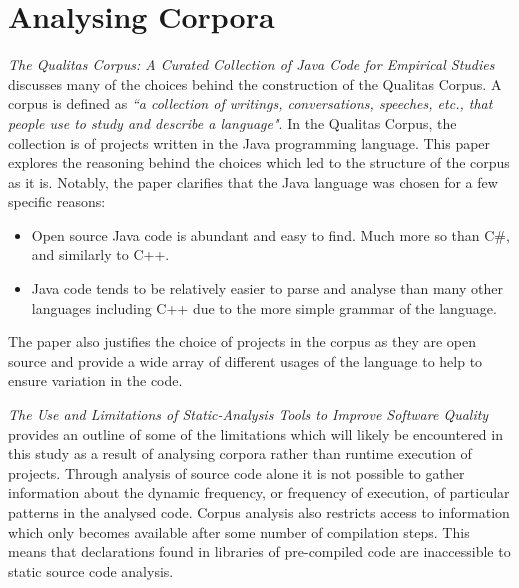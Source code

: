 \section{Analysing Corpora}
\textit{The Qualitas Corpus: A Curated Collection of Java Code for Empirical Studies}~\cite{QualitasCorpus} discusses many of the choices behind the construction of the Qualitas Corpus. A corpus is defined as \textit{``a collection of writings, conversations, speeches, etc., that people use to study and describe a language"}. In the Qualitas Corpus, the collection is of projects written in the Java programming language. This paper explores the reasoning behind the choices which led to the structure of the corpus as it is. Notably, the paper clarifies that the Java language was chosen for a few specific reasons:
\begin{itemize}
	\item Open source Java code is abundant and easy to find. Much more so than C\#, and similarly to C++.
	\item Java code tends to be relatively easier to parse and analyse than many other languages including C++ due to the more simple grammar of the language.\newline
\end{itemize}

The paper also justifies the choice of projects in the corpus as they are open source and provide a wide array of different usages of the language to help to ensure variation in the code.
\newline

\textit{The Use and Limitations of Static-Analysis Tools to Improve Software Quality}~\cite{StaticAnalysisLimits} provides an outline of some of the limitations which will likely be encountered in this study as a result of analysing corpora rather than runtime execution of projects. Through analysis of source code alone it is not possible to gather information about the dynamic frequency, or frequency of execution, of particular patterns in the analysed code. Corpus analysis also restricts access to information which only becomes available after some number of compilation steps. This means that declarations found in libraries of pre-compiled code are inaccessible to static source code analysis.

